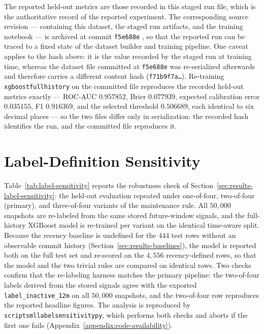 The reported held-out metrics are those recorded in this staged run file, which is the authoritative record of the reported experiment. The corresponding source revision --- containing this dataset, the staged run artifacts, and the training notebook --- is archived at commit \texttt{f5e688e} \cite{ossRiskRadarReadme}, so that the reported run can be traced to a fixed state of the dataset builder and training pipeline. One caveat applies to the hash above: it is the value recorded by the staged run at training time, whereas the dataset file committed at \texttt{f5e688e} was re-serialized afterwards and therefore carries a different content hash (\texttt{f71b9f7a\ldots}). Re-training \texttt{xgboost\sdash full\sdash history} on the committed file reproduces the recorded held-out metrics exactly --- ROC-AUC \(0.957852\), Brier \(0.077939\), expected calibration error \(0.035155\), F1 \(0.916369\), and the selected threshold \(0.506689\), each identical to six decimal places --- so the two files differ only in serialization: the recorded hash identifies the run, and the committed file reproduces it.

\section{Label-Definition Sensitivity}
\label{appendix:label-sensitivity}

Table~\ref{tab:label-sensitivity} reports the robustness check of
Section~\ref{sec:results-label-sensitivity}: the held-out evaluation repeated under
one-of-four, two-of-four (primary), and three-of-four variants of the maintenance
rule. All \(50{,}000\) snapshots are re-labeled from the same stored future-window
signals, and the full-history XGBoost model is re-trained per variant on the
identical time-aware split. Because the recency baseline is undefined for the
\(444\) test rows without an observable commit history
(Section~\ref{sec:results-baselines}), the model is reported both on the full test
set and re-scored on the \(4{,}556\) recency-defined rows, so that the model and
the two trivial rules are compared on identical rows. Two checks confirm that the
re-labeling harness matches the primary pipeline: the two-of-four labels derived
from the stored signals agree with the exported \texttt{label\_inactive\_12m} on
all \(50{,}000\) snapshots, and the two-of-four row reproduces the reported
headline figures. The analysis is reproduced by
\texttt{scripts\sslash ml\sslash label\su sensitivity\sdot py}, which performs
both checks and aborts if the first one fails
(Appendix~\ref{appendix:code-availability}).

